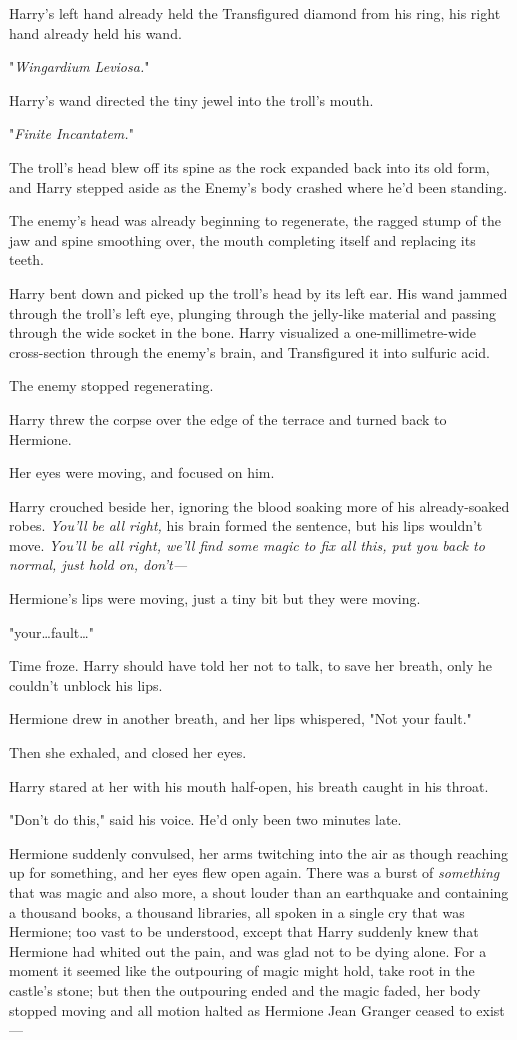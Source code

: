 Harry's left hand already held the Transfigured diamond from his ring, his
right hand already held his wand.

"\emph{Wingardium Leviosa.}"

Harry's wand directed the tiny jewel into the troll's mouth.

"\emph{Finite Incantatem.}"

The troll's head blew off its spine as the rock expanded back into its old
form, and Harry stepped aside as the Enemy's body crashed where he'd been
standing.

The enemy's head was already beginning to regenerate, the ragged stump of the
jaw and spine smoothing over, the mouth completing itself and replacing its
teeth.

Harry bent down and picked up the troll's head by its left ear. His wand jammed
through the troll's left eye, plunging through the jelly-like material and
passing through the wide socket in the bone. Harry visualized a
one-millimetre-wide cross-section through the enemy's brain, and Transfigured
it into sulfuric acid.

The enemy stopped regenerating.

Harry threw the corpse over the edge of the terrace and turned back to Hermione.

Her eyes were moving, and focused on him.

Harry crouched beside her, ignoring the blood soaking more of his
already-soaked robes. \emph{You'll be all right,} his brain formed the
sentence, but his lips wouldn't move. \emph{You'll be all right, we'll find
some magic to fix all this, put you back to normal, just hold on, don't---}

Hermione's lips were moving, just a tiny bit but they were moving.

"your…fault…"

Time froze. Harry should have told her not to talk, to save her breath, only he
couldn't unblock his lips.

Hermione drew in another breath, and her lips whispered, "Not your fault."

Then she exhaled, and closed her eyes.

Harry stared at her with his mouth half-open, his breath caught in his throat.

"Don't do this," said his voice. He'd only been two minutes late.

Hermione suddenly convulsed, her arms twitching into the air as though reaching
up for something, and her eyes flew open again. There was a burst of
\emph{something} that was magic and also more, a shout louder than an
earthquake and containing a thousand books, a thousand libraries, all spoken in
a single cry that was Hermione; too vast to be understood, except that Harry
suddenly knew that Hermione had whited out the pain, and was glad not to be
dying alone. For a moment it seemed like the outpouring of magic might hold,
take root in the castle's stone; but then the outpouring ended and the magic
faded, her body stopped moving and all motion halted as Hermione Jean Granger
ceased to exist---


